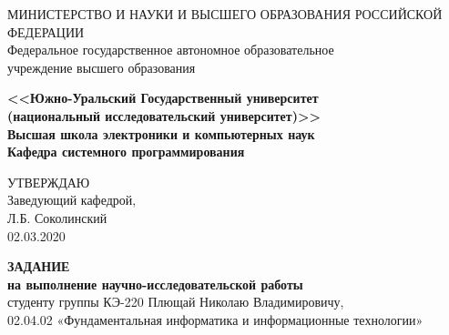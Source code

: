 \begin{titlepage}
    
    \begin{center}
        МИНИСТЕРСТВО И НАУКИ И ВЫСШЕГО ОБРАЗОВАНИЯ РОССИЙСКОЙ ФЕДЕРАЦИИ\\
        Федеральное государственное автономное образовательное\\
        учреждение высшего образования

        \textbf{
        <<Южно-Уральский Государственный университет\\
        (национальный исследовательский университет)>>\\
        Высшая школа электроники и компьютерных наук\\
        Кафедра системного программирования
        }
        \bigskip
    \end{center}

    \hfill
    \begin{minipage}{0.4\textwidth}
        УТВЕРЖДАЮ\\
        Заведующий кафедрой,\\
        \underline{\hspace{2cm}} Л.Б. Соколинский\\
        02.03.2020
    \end{minipage}

    \begin{center}
        \textbf{ЗАДАНИЕ}\\
        \textbf{на выполнение научно-исследовательской работы}\\
        студенту группы КЭ-220 Плющай Николаю Владимировичу,\\
        02.04.02 «Фундаментальная информатика и информационные технологии»\\
    \end{center}


\end{titlepage}
